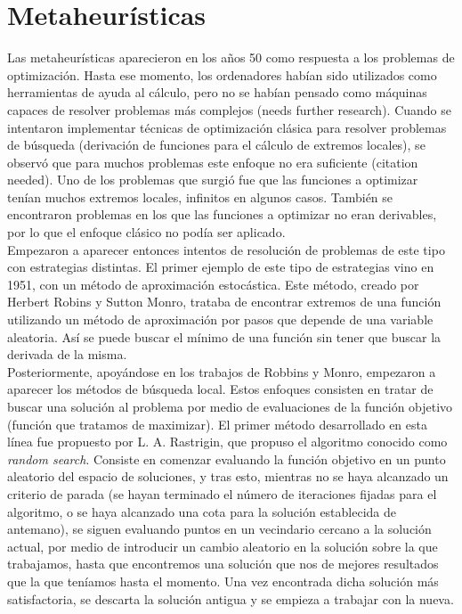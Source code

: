 \documentclass[12pt]{article} \usepackage[utf8x]{inputenc}
\begin{document}
\section{Metaheurísticas}

Las metaheurísticas aparecieron en los años 50 como respuesta a los
problemas de optimización. Hasta ese momento, los ordenadores habían
sido utilizados como herramientas de ayuda al cálculo, pero no se
habían pensado como máquinas capaces de resolver problemas más
complejos (needs further research). Cuando se intentaron implementar
técnicas de optimización clásica para resolver problemas de búsqueda
(derivación de funciones para el cálculo de extremos locales), se
observó que para muchos problemas este enfoque no era suficiente
(citation needed). Uno de los problemas que surgió fue que las
funciones a optimizar tenían muchos extremos locales, infinitos en
algunos casos. También se encontraron problemas en los que las
funciones a optimizar no eran derivables, por lo que el enfoque
clásico no podía
ser aplicado.\\

Empezaron a aparecer entonces intentos de resolución de problemas de
este tipo con estrategias distintas. El primer ejemplo de este tipo de
estrategias vino en 1951, con un método de aproximación estocástica.
Este método, creado por Herbert Robins y Sutton Monro, trataba de
encontrar extremos de una función utilizando un método de aproximación
por pasos que depende de una variable aleatoria. Así se puede buscar
el mínimo de una función sin tener que buscar la derivada de la misma.\\

Posteriormente, apoyándose en los trabajos de Robbins y Monro,
empezaron a aparecer los métodos de búsqueda local. Estos enfoques
consisten en tratar de buscar una solución al problema por medio de
evaluaciones de la función objetivo (función que tratamos de
maximizar). El primer método desarrollado en esta línea fue propuesto
por L. A. Rastrigin, que propuso el algoritmo conocido como
\textit{random search}. Consiste en comenzar evaluando la función
objetivo en un punto aleatorio del espacio de soluciones, y tras esto,
mientras no se haya alcanzado un criterio de parada (se hayan
terminado el número de iteraciones fijadas para el algoritmo, o se
haya alcanzado una cota para la solución establecida de antemano), se
siguen evaluando puntos en un vecindario cercano a la solución actual,
por medio de introducir un cambio aleatorio en la solución sobre la
que trabajamos, hasta que encontremos una solución que nos de mejores
resultados que la que teníamos hasta el momento. Una vez encontrada
dicha solución más satisfactoria, se descarta la solución antigua
y se empieza a trabajar con la nueva.\\
\end{document}
